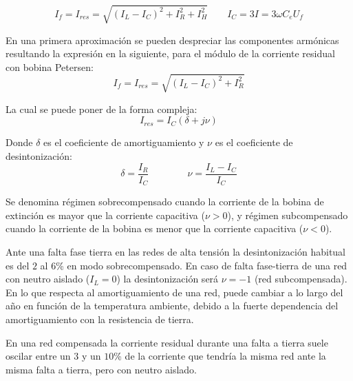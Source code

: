             \begin{equation}
                I_\textit{f} = I_\textit{res} = \sqrt{(I_\textit{L} - I_\textit{C})^2 + I_\textit{R}^2 + I_\textit{H}^2}\qquad I_\textit{C} = 3I = 3\omega C_\textit{e}U_\textit{f}
            \end{equation}

            En una primera aproximación se pueden despreciar las componentes armónicas resultando la expresión en la siguiente, para el módulo de la corriente residual con bobina Petersen:
            \begin{equation}
                I_\textit{f} = I_\textit{res} = \sqrt{(I_\textit{L} - I_\textit{C})^2 + I_\textit{R}^2}
            \end{equation}

            La cual se puede poner de la forma compleja:
            \begin{equation}
                I_\textit{res} = I_\textit{C}(\delta + j\nu)
            \end{equation}

            Donde $\delta$ es el coeficiente de amortiguamiento y $\nu$ es el coeficiente de desintonización:
            \begin{equation}\label{eq:desint}
                \delta = \dfrac{I_\textit{R}}{I_\textit{C}}\qquad \qquad \nu = \dfrac{I_\textit{L}-I_\textit{C}}{I_\textit{C}}
            \end{equation}

            Se denomina régimen sobrecompensado cuando la corriente de la bobina de extinción es mayor que la corriente capacitiva ($\nu > 0$), y régimen subcompensado cuando la corriente de la bobina es menor que la corriente capacitiva ($\nu < 0$).\newline
            
            Ante una falta fase tierra en las redes de alta tensión la desintonización habitual es del $2$ al $6$\!\% en modo sobrecompensado. En caso de falta fase-tierra de una red con neutro aislado ($I_\textit{L} = 0$) la desintonización será $\nu = -1$ (red subcompensada). En lo que respecta al amortiguamiento de una red, puede cambiar a lo largo del año en función de la temperatura ambiente, debido a la fuerte dependencia del amortiguamiento con la resistencia de tierra.\newline

            En una red compensada la corriente residual durante una falta a tierra suele oscilar entre un $3$ y un $10$\!\% de la corriente que tendría la misma red ante la misma falta a tierra, pero con neutro aislado.\newline

